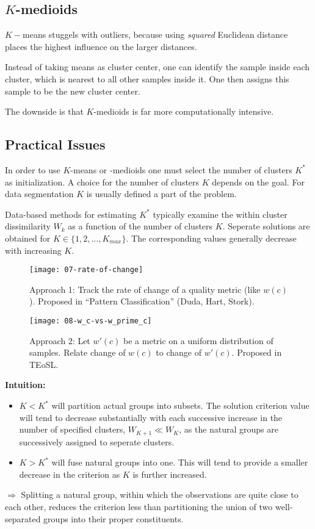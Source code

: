 \subsection*{\(K\)-medioids}
 \(K-\)means stuggels with outliers, because using \textit{squared} Euclidean distance places the highest influence on the larger distances.

 Instead of taking means as cluster center, one can identify the sample inside each cluster, which is nearest to all other samples inside it. One then assigns this sample to be the new cluster center.

 The downside is that \(K\)-medioids is far more computationally intensive.

 \subsection*{Practical Issues}
 In order to use \(K\)-means or -medioids one must select the number of clusters \(K^*\) as initialization. A choice for the number of clusters \(K\) depends on the goal. For data segmentation \(K\) is usually defined a part of the problem.

 Data-based methods for estimating \(K^*\) typically examine the within cluster dissimilarity \(W_k\) as a function of the number of clusters \(K\). Seperate solutions are obtained for \(K \in \{1,2,\dots,K_{max}\}\). The corresponding values generally decrease with increasing \(K\).

\begin{figure}[H]
 	\centering
 	\begin{minipage}[b]{0.49\textwidth}
   	\texttt{[image: 07-rate-of-change]}
   \caption{Approach 1: Track the rate of change of a quality metric (like $w(c)$). Proposed in ``Pattern Classification'' (Duda, Hart, Stork).}
 	\end{minipage}
 	\begin{minipage}[b]{0.49\textwidth}
   	\texttt{[image: 08-w\_c-vs-w\_prime\_c]}
   \caption{Approach 2: Let $w'(c)$ be a metric on a uniform distribution of samples. Relate change of $w(c)$ to change of $w'(c)$. Proposed in TEoSL.}
 	\end{minipage}
\end{figure}

\textbf{Intuition:}
\begin{itemize}
    \item
        \(K < K^*\) will partition actual groups into subsets. The solution criterion value will tend to decrease substantially with each successive increase in the number of specified clusters, \(W_{K+1} \ll W_K\), as the natural groups are successively assigned to seperate clusters.
    \item
        \(K > K^*\) will fuse natural groups into one. This will tend to provide a smaller decrease in the criterion as \(K\) is further increased.
\end{itemize}
\(\Rightarrow\) Splitting a natural group, within which the observations are quite close to each other, reduces the criterion less than partitioning the union of two well-separated groups into their proper constituents.

